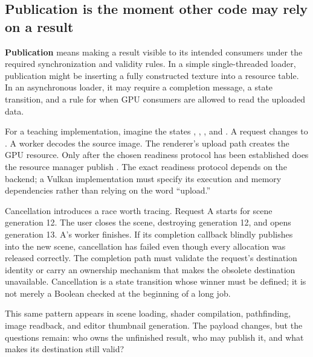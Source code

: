 \subsection{Publication is the moment other code may rely on a result}\label{01-foundations-i-ch008-publication-is-the-moment-other-code-may-rely-on-a-result}

\hypertarget{01-foundations-i-ch008-publication-is-the-moment-other-code-may-rely-on-a-result}{}

\textbf{Publication} means making a result visible to its intended consumers under the required synchronization and validity rules. In a simple single-threaded loader, publication might be inserting a fully constructed texture into a resource table. In an asynchronous loader, it may require a completion message, a state transition, and a rule for when GPU consumers are allowed to read the uploaded data.

For a teaching implementation, imagine the states , , , and . A request changes  to . A worker decodes the source image. The renderer's upload path creates the GPU resource. Only after the chosen readiness protocol has been established does the resource manager publish . The exact readiness protocol depends on the backend; a Vulkan implementation must specify its execution and memory dependencies rather than relying on the word ``upload.''

Cancellation introduces a race worth tracing. Request A starts for scene generation 12. The user closes the scene, destroying generation 12, and opens generation 13. A's worker finishes. If its completion callback blindly publishes into the new scene, cancellation has failed even though every allocation was released correctly. The completion path must validate the request's destination identity or carry an ownership mechanism that makes the obsolete destination unavailable. Cancellation is a state transition whose winner must be defined; it is not merely a Boolean checked at the beginning of a long job.


This same pattern appears in scene loading, shader compilation, pathfinding, image readback, and editor thumbnail generation. The payload changes, but the questions remain: who owns the unfinished result, who may publish it, and what makes its destination still valid?

